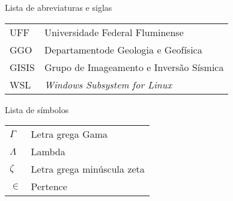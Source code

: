\listoffigures*
\cleardoublepage

\listoftables*
\cleardoublepage

\begin{center}
\fonteLista Lista de abreviaturas e siglas 
\end{center}

\vspace{2cm}
\fonteNormalSize
\begin{tabular}{l l}
    UFF & Universidade Federal Fluminense \\ [1.0ex]
    GGO & Departamentode Geologia e Geofísica \\ [1.0ex]
    GISIS & Grupo de Imageamento e Inversão Sísmica \\ [1.0ex]
	WSL & \textit{Windows Subsystem for Linux} \\ [1.0ex]
\end{tabular}
\cleardoublepage


\begin{center}
    \fonteLista Lista de símbolos
\end{center}

\vspace{2cm}
\fonteNormalSize
\begin{tabular}{l l}
    $ \Gamma $ & Letra grega Gama \\ [1.0ex]
    $ \Lambda $ & Lambda \\ [1.0ex]
    $ \zeta $ & Letra grega minúscula zeta \\ [1.0ex]
    $ \in $ & Pertence
\end{tabular}

    

